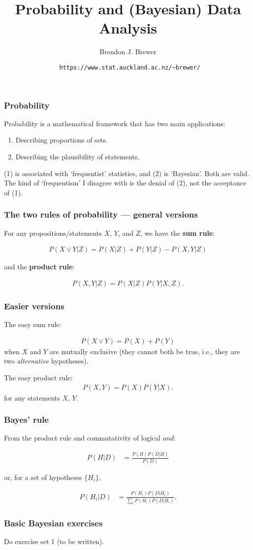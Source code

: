 \documentclass{beamer}
\title{Probability and (Bayesian) Data Analysis}
\author{Brendon J. Brewer}
\institute{Department of Statistics\\
The University of Auckland}
\date{{\tt \color{blue} https://www.stat.auckland.ac.nz/\~{ }brewer/}}
\begin{document}
\frame{\titlepage}


\begin{frame}
\frametitle{Probability}

Probability is a mathematical framework that has two main applications:
\vspace{0.5em}
\begin{enumerate}
  \item[(1)] Describing proportions of sets.
  \item[(2)] Describing the plausibility of statements.
\end{enumerate}
\vspace{1em}
(1) is associated with `frequentist' statistics, and (2) is `Bayesian'.
Both are valid. The kind of `frequentism' I disagree with is the denial
of (2), not the acceptance of (1).

\end{frame}


\begin{frame}
\frametitle{The two rules of probability --- general versions}
For any propositions/statements $X$, $Y$, and $Z$, we have
the {\bf sum rule}:

\begin{align}
P(X \vee Y | Z) = P(X | Z) + P(Y | Z) - P(X, Y | Z)
\end{align}

and the {\bf product rule}:

\begin{align}
P(X, Y | Z) = P(X | Z)P(Y | X, Z).
\end{align}

\end{frame}


\begin{frame}
\frametitle{Easier versions}
The easy sum rule:

\begin{align}
P(X \vee Y) = P(X) + P(Y)
\end{align}
when $X$ and $Y$ are mutually exclusive (they cannot both be true, i.e.,
they are two {\em alternative} hypotheses).

The easy product rule:
\begin{align}
P(X, Y) = P(X)P(Y | X).
\end{align}
for any statements $X$, $Y$.

\end{frame}


\begin{frame}
\frametitle{Bayes' rule}

From the product rule and commutativity of logical {\em and}:

\begin{align}
P(H|D) &= \frac{P(H)P(D|H)}{P(D)}
\end{align}

or, for a set of hypotheses $\{H_i\}$,

\begin{align}
P(H_i|D) &= \frac{P(H_i)P(D|H_i)}{\sum_i P(H_i)P(D|H_i)}.
\end{align}


\end{frame}


\begin{frame}
\frametitle{Basic Bayesian exercises}

Do exercise set 1 (to be written).

\end{frame}
\end{document}

